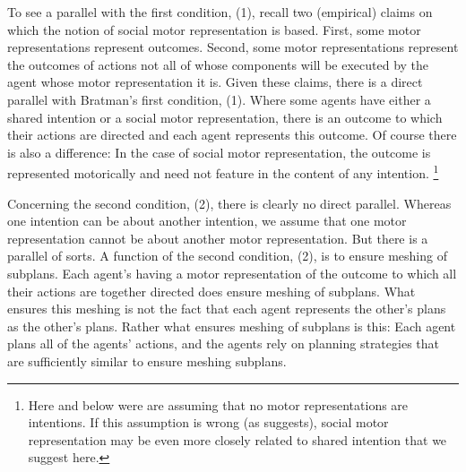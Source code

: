\documentclass[12pt,\papersize]{extarticle}
\begin{document}
To see a parallel with the first condition, (1), recall two (empirical) claims on which the notion of social motor representation is based.
First, some motor representations represent outcomes.
Second, some motor representations represent the outcomes of actions not all of whose components will be executed by the agent whose motor representation it is.
Given these claims, there is a direct parallel with Bratman's first condition, (1).
Where some agents have either a shared intention or a social motor representation, there is an outcome to which their actions are directed and each agent represents this outcome.
Of course there is also a difference: In the case of social motor representation, the outcome is represented motorically and need not feature in the content of any intention.%
\footnote{
Here and below were are assuming that no motor representations are intentions. 
If this assumption is wrong (as \citealp{pacherie:2008_action} suggests), social motor representation may be even more closely related to shared intention that we suggest here.
}


Concerning the second condition, (2), there is clearly no {direct} parallel. 
Whereas one intention can be about another intention, 
we assume that one motor representation cannot be about another motor representation.
But there is a parallel of sorts. 
A function of the second condition, (2), is to ensure meshing of subplans. 
Each agent's having a motor representation of the outcome to which all their actions are together directed does ensure meshing of subplans.
What ensures this meshing is not the fact that each agent represents the other's plans {as the other's plans}.
Rather what ensures meshing of subplans is this:
Each agent plans all of the agents' actions, and the agents rely on planning strategies that are sufficiently similar to ensure meshing subplans.
\end{document}
